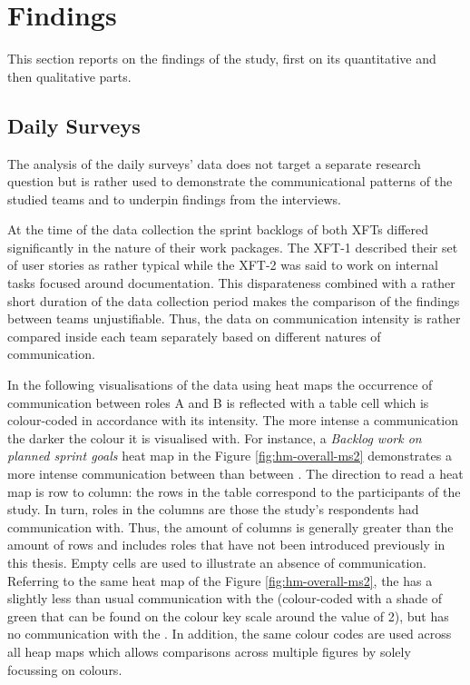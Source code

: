\chapter{Findings}
\label{chap:findings}
This section reports on the findings of the study, first on its quantitative and then qualitative parts.

\section{Daily Surveys}
\label{sec:findings-daily-surveys}
The analysis of the daily surveys' data does not target a separate research question but is rather used to demonstrate the communicational patterns of the studied teams and to underpin findings from the interviews.

At the time of the data collection the sprint backlogs of both \acp{XFT} differed significantly in the nature of their work packages. The \ac{XFT}-1 described their set of user stories as rather typical while the \ac{XFT}-2 was said to work on internal tasks focused around documentation. This disparateness combined with a rather short duration of the data collection period makes the comparison of the findings between teams unjustifiable. Thus, the data on communication intensity is rather compared inside each team separately based on different natures of communication.

In the following visualisations of the data using heat maps the occurrence of communication between roles A and B is reflected with a table cell which is colour-coded in accordance with its intensity. The more intense a communication the darker the colour it is visualised with. For instance, a \emph{Backlog work on planned sprint goals} heat map in the Figure \ref{fig:hm-overall-ms2} demonstrates a more intense communication between  than between . The direction to read a heat map is row to column: the rows in the table correspond to the participants of the study. In turn, roles in the columns are those the study's respondents had communication with. Thus, the amount of columns is generally greater than the amount of rows and includes roles that have not been introduced previously in this thesis. Empty cells are used to illustrate an absence of communication. Referring to the same heat map of the Figure \ref{fig:hm-overall-ms2}, the  has a slightly less than usual communication with the  (colour-coded with a shade of green that can be found on the colour key scale around the value of 2), but has no communication with the . In addition, the same colour codes are used across all heap maps which allows comparisons across multiple figures by solely focussing on colours.

